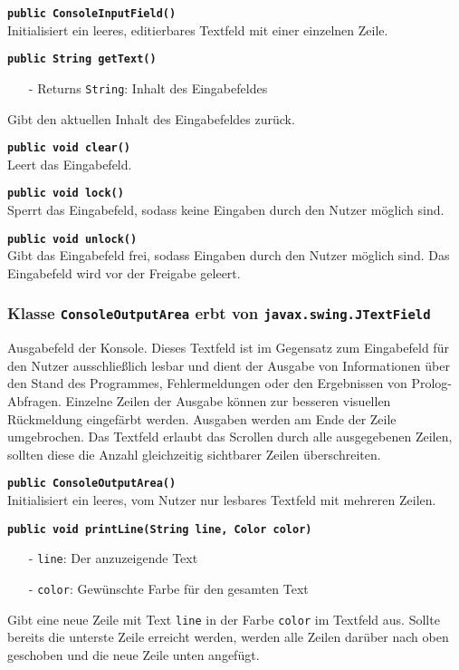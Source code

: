 \documentclass[parskip=full,11pt,twoside]{scrartcl}
\begin{document}
\textbf{\texttt{public ConsoleInputField()}}\\
Initialisiert ein leeres, editierbares Textfeld mit einer einzelnen Zeile.

\textbf{\texttt{public String getText()}}
\begin{itemize}[noitemsep]
	\item[-] Returns \texttt{String}: Inhalt des Eingabefeldes
\end{itemize}
Gibt den aktuellen Inhalt des Eingabefeldes zurück.

\textbf{\texttt{public void clear()}}\\
Leert das Eingabefeld.

\textbf{\texttt{public void lock()}}\\
Sperrt das Eingabefeld, sodass keine Eingaben durch den Nutzer möglich sind.

\textbf{\texttt{public void unlock()}}\\
Gibt das Eingabefeld frei, sodass Eingaben durch den Nutzer möglich sind. Das Eingabefeld wird vor der Freigabe geleert.

\subsubsection{Klasse \texttt{ConsoleOutputArea} erbt von \texttt{javax.swing.JTextField}}

Ausgabefeld der Konsole. Dieses Textfeld ist im Gegensatz zum Eingabefeld für den Nutzer ausschließlich lesbar und dient der Ausgabe von Informationen über den Stand des Programmes, Fehlermeldungen oder den Ergebnissen von Prolog-Abfragen. Einzelne Zeilen der Ausgabe können zur besseren visuellen Rückmeldung eingefärbt werden. Ausgaben werden am Ende der Zeile umgebrochen. Das Textfeld erlaubt das Scrollen durch alle ausgegebenen Zeilen, sollten diese die Anzahl gleichzeitig sichtbarer Zeilen überschreiten.

\textbf{\texttt{public ConsoleOutputArea()}}\\
Initialisiert ein leeres, vom Nutzer nur lesbares Textfeld mit mehreren Zeilen.

\textbf{\texttt{public void printLine(String line, Color color)}}
\begin{itemize}[noitemsep]
	\item[-] \texttt{line}: Der anzuzeigende Text
	\item[-] \texttt{color}: Gewünschte Farbe für den gesamten Text
\end{itemize}
Gibt eine neue Zeile mit Text \texttt{line} in der Farbe \texttt{color} im Textfeld aus. Sollte bereits die unterste Zeile erreicht werden, werden alle Zeilen darüber nach oben geschoben und die neue Zeile unten angefügt.
\end{document}
